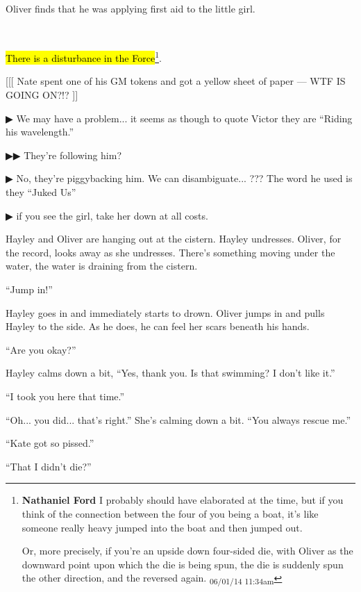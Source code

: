 Oliver finds that he was applying first aid to the little girl.

{\parskip=0pt
~

 \hl{There is a disturbance in the Force}\footnote{\textbf{Nathaniel Ford }I probably should have elaborated at the time, but if you think of the connection between the four of you being a boat, it's like someone really heavy jumped into the boat and then jumped out.

Or, more precisely, if you're an upside down four-sided die, with Oliver as the downward point upon which the die is being spun, the die is suddenly spun the other direction, and the reversed again. \textsubscript{06/01/14 11:34am}}.

{[}{[}{[} Nate spent one of his GM tokens and got a yellow sheet of paper --- WTF IS GOING ON?!? {]}{]}



 {\color[RGB]{68,68,68}▶}  We may have a problem... it seems as though to quote Victor they are ``Riding his wavelength.''

 {\color[RGB]{68,68,68}▶▶} They're following him?

 {\color[RGB]{68,68,68}▶} No, they're piggybacking him.  We can disambiguate... ??? The word he used is they ``Juked Us''

 {\color[RGB]{68,68,68}▶}  if you see the girl, take her down at all costs. 

}


Hayley and Oliver are hanging out at the cistern.  Hayley undresses.  Oliver, for the record, looks away as she undresses.  There's something moving under the water, the water is draining from the cistern.

``Jump in!''

Hayley goes in and immediately starts to drown.  Oliver jumps in and pulls Hayley to the side. As he does, he can feel her scars beneath his hands.

``Are you okay?''

Hayley calms down a bit, ``Yes, thank you.  Is that swimming?  I don't like it.''

``I took you here that time.''

``Oh... you did... that's right.''  She's calming down a bit.  ``You always rescue me.''

``Kate got so pissed.''

``That I didn't die?''

